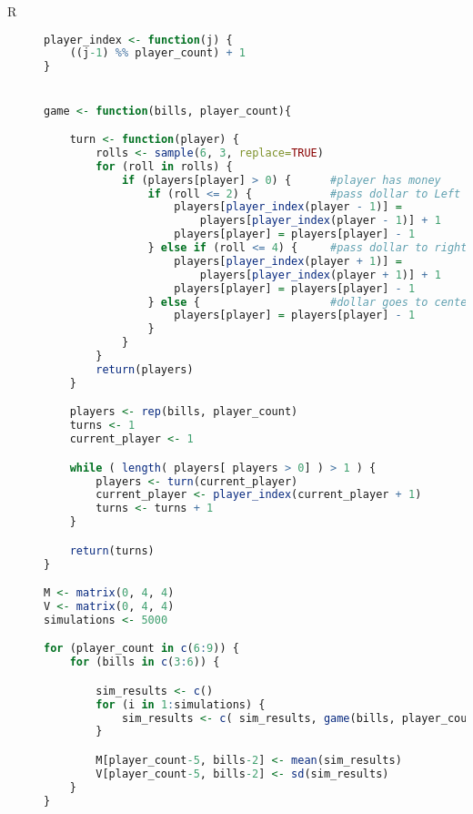 
\begin{description}



 \item[R] 


\begin{lstlisting}[language=R]
player_index <- function(j) {
    ((j-1) %% player_count) + 1
}


game <- function(bills, player_count){

    turn <- function(player) {
        rolls <- sample(6, 3, replace=TRUE)
        for (roll in rolls) {
            if (players[player] > 0) {      #player has money
                if (roll <= 2) {            #pass dollar to Left
                    players[player_index(player - 1)] =
                        players[player_index(player - 1)] + 1 
                    players[player] = players[player] - 1
                } else if (roll <= 4) {     #pass dollar to right
                    players[player_index(player + 1)] =
                        players[player_index(player + 1)] + 1
                    players[player] = players[player] - 1
                } else {                    #dollar goes to center
                    players[player] = players[player] - 1
                }
            }
        }
        return(players)
    }

    players <- rep(bills, player_count)
    turns <- 1
    current_player <- 1

    while ( length( players[ players > 0] ) > 1 ) {
        players <- turn(current_player)
        current_player <- player_index(current_player + 1)
        turns <- turns + 1
    }

    return(turns)
}

M <- matrix(0, 4, 4)
V <- matrix(0, 4, 4)
simulations <- 5000

for (player_count in c(6:9)) {
    for (bills in c(3:6)) {

        sim_results <- c()
        for (i in 1:simulations) {
            sim_results <- c( sim_results, game(bills, player_count) )
        }

        M[player_count-5, bills-2] <- mean(sim_results)
        V[player_count-5, bills-2] <- sd(sim_results)
    }
}


\end{lstlisting}
\end{description}
